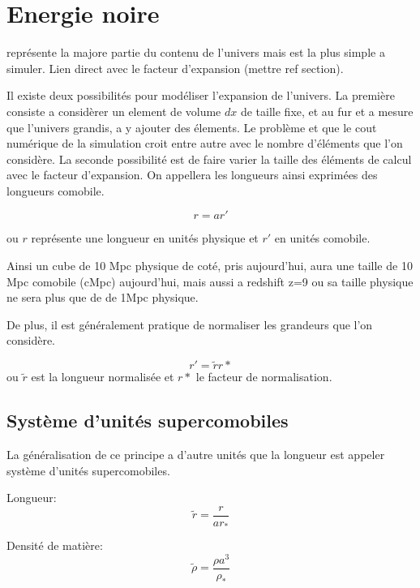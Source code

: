 \section{Energie noire}
représente la majore partie du contenu de l'univers mais est la plus simple a simuler.
Lien direct avec le facteur d'expansion (mettre ref section).

Il existe deux possibilités pour modéliser l'expansion de l'univers.
La première consiste a considèrer un element de volume $dx$ de taille fixe, et au fur et a mesure que l'univers grandis, a y ajouter des élements.
Le problème et que le cout numérique de la simulation croit entre autre avec le nombre d'éléments que l'on considère.
La seconde possibilité est de faire varier la taille des éléments de calcul avec le facteur d'expansion.
On appellera les longueurs ainsi exprimées des longueurs comobile.

\begin{equation}
r=a r'
\end{equation}

ou $r$ représente une longueur en unités physique et $r'$ en unités comobile.

Ainsi un cube de 10 Mpc physique de coté, pris aujourd'hui, aura une taille de 10 Mpc comobile (cMpc) aujourd'hui, mais aussi a redshift z=9 ou sa taille physique ne sera plus que de de 1Mpc physique.

De plus, il est généralement pratique de normaliser les grandeurs que l'on considère. 

\begin{equation}
r'=\tilde{r}r*
\end{equation}
ou $\tilde{r}$ est la longueur normalisée et $r*$ le facteur de normalisation.


\subsection{Système d'unités supercomobiles}
La généralisation de ce principe a d'autre unités que la longueur est appeler système d'unités supercomobiles.
\citep{martel_convenient_1998}

Longueur:
\begin{equation}
\tilde{r}=\frac{r}{ar_*}
\end{equation}

Densité de matière:
\begin{equation}
\tilde{\rho}=\frac{\rho a^3}{\rho_*}
\end{equation}

